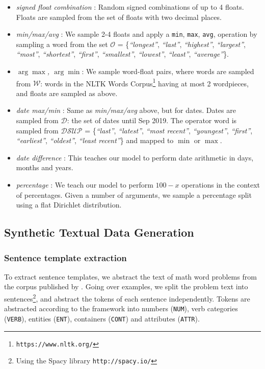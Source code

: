 \documentclass[11pt,a4paper]{article}
\newcommand\nl[1]{{\it``#1''}}
\begin{document}
\begin{itemize}[leftmargin=*,topsep=0pt,itemsep=-0.2em,topsep=0pt,parsep=0pt]
\item \emph{signed float combination} : Random signed combinations of up to 4 floats. Floats are sampled from the set of floats with two decimal places.

\item \emph{min/max/avg} :
We sample 2-4 floats and apply a \texttt{min}, \texttt{max}, \texttt{avg}, operation by sampling a word from the set $\mathcal{O}$ = \{\nl{longest}, \nl{last}, \nl{highest}, \nl{largest}, \nl{most}, \nl{shortest}, \nl{first}, \nl{smallest}, \nl{lowest}, \nl{least}, \nl{average}\}.

\item \emph{$\arg\max$, $\arg\min$}: 
We sample word-float pairs, where words are sampled from $\mathcal{W}$: words in the NLTK Words Corpus\footnote{\texttt{https://www.nltk.org/}} having at most 2 wordpieces, and floats are sampled as above.

\item \emph{date max/min} : Same as \emph{min/max/avg} above, but for dates. Dates are sampled from $\mathcal{D}$: the set of dates until Sep 2019. The operator word is sampled from $\mathcal{DSUP}$ = \{\nl{last}, \nl{latest}, \nl{most recent}, \nl{youngest}, \nl{first}, \nl{earliest}, \nl{oldest}, \nl{least recent}\} and mapped to $\min$ or $\max$.

\item \emph{date difference} : This teaches our model to perform date arithmetic in days, months and years.

\item \emph{percentage} : We teach our model to perform $100-x$ operations in the context of percentages. Given a number of arguments, we sample a percentage split using a flat Dirichlet distribution.
\end{itemize}


\subsection{Synthetic Textual Data Generation}
\label{section:textual_data_details}

\subsubsection{Sentence template extraction}
To extract sentence templates, we abstract the text of math word problems from the corpus published by \citet{hosseini2014learning}.
Going over examples, we split the problem text into sentences\footnote{Using the Spacy library \texttt{http://spacy.io/}}, and abstract the tokens of each sentence independently. Tokens are abstracted according to the framework into numbers (\texttt{NUM}), verb categories (\texttt{VERB}), entities (\texttt{ENT}), containers (\texttt{CONT}) and attributes (\texttt{ATTR}).
\end{document}

